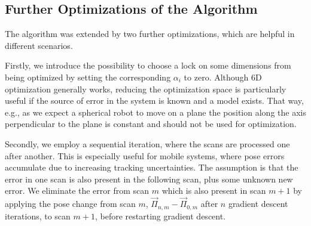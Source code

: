 \subsection{Further Optimizations of the Algorithm}
\label{ssec:furtheropts}

The algorithm was extended by two further optimizations, which are helpful in different scenarios.

Firstly, we introduce the possibility to choose a lock on some dimensions from being optimized by setting the corresponding $\alpha_i$ to zero.
Although 6D optimization generally works, reducing the optimization space is particularly useful if the source of error in the system is known and a model exists.
That way, e.g., as we expect a spherical robot to move on a plane the position along the axis perpendicular to the plane is constant and should not be used for optimization.

Secondly, we employ a sequential iteration, where the scans are processed one after another. 
This is especially useful for mobile systems, where pose errors accumulate due to increasing tracking uncertainties.
The assumption is that the error in one scan is also present in the following scan, plus some unknown new error.
We eliminate the error from scan $m$ which is also present in scan $m+1$ by applying the pose change from scan $m$, $\vec{\Pi}_{n,m} - \vec{\Pi}_{0,m}$ after $n$ gradient descent iterations, to scan $m+1$, before restarting gradient descent.

